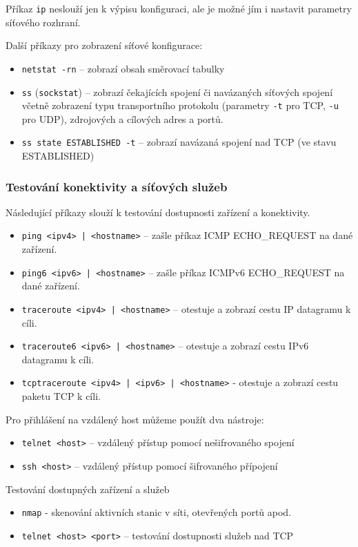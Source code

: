 Příkaz {\tt ip} neslouží jen k výpisu konfiguraci, ale je možné jím i nastavit parametry síťového rozhraní.

Další příkazy pro zobrazení síťové konfigurace:
\begin{itemize}
  \item \texttt{netstat -rn} -- zobrazí obsah směrovací tabulky
  \item \texttt{ss} (\texttt{sockstat}) -- zobrazí čekajících spojení či navázaných síťových spojení včetně zobrazení typu transportního protokolu (parametry {\tt -t} pro TCP, {\tt -u} pro UDP), zdrojových a cílových adres a portů.
  \item {\tt ss state ESTABLISHED -t} -- zobrazí navázaná spojení nad TCP (ve stavu ESTABLISHED)
\end{itemize}

\subsubsection{Testování konektivity a síťových služeb}
Následující příkazy slouží k testování dostupnosti zařízení a konektivity. 
\begin{itemize}
  \item \texttt{ping <ipv4> | <hostname>} -- zašle příkaz ICMP ECHO\_REQUEST na dané zařízení.
  \item \texttt{ping6 <ipv6> | <hostname>} -- zašle příkaz ICMPv6 ECHO\_REQUEST na dané zařízení.
  \item \texttt{traceroute <ipv4> | <hostname>} -- otestuje a zobrazí cestu IP datagramu  k cíli.
  \item \texttt{traceroute6 <ipv6> | <hostname>} -- otestuje a zobrazí cestu IPv6 datagramu k cíli.
  \item \texttt{tcptraceroute <ipv4> | <ipv6> | <hostname>} - otestuje a zobrazí cestu paketu TCP k cíli.
\end{itemize}

\noindent
Pro přihlášení na vzdálený host můžeme použít dva nástroje:
\begin{itemize}
  \item \texttt{telnet <host>} -- vzdálený přístup pomocí nešifrovaného spojení
  \item \texttt{ssh <host>} -- vzdálený přístup pomocí šifrovaného přípojení
\end{itemize}

\noindent
Testování dostupných zařízení a služeb
\begin{itemize}
  \item \texttt{nmap} - skenování aktivních stanic v síti, otevřených portů apod. 
  \item \texttt{telnet <host> <port>} -- testování dostupnosti služeb nad TCP
\end{itemize}

